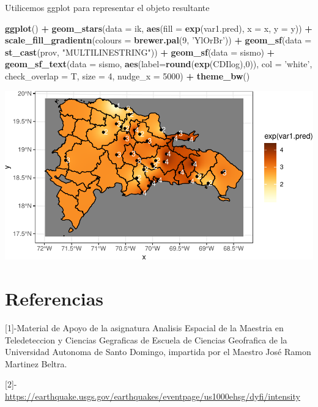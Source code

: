 \documentclass[11pt,]{article}
\newenvironment{Shaded}{\begin{snugshade}}{\end{snugshade}}
\newcommand{\KeywordTok}[1]{\textcolor[rgb]{0.13,0.29,0.53}{\textbf{#1}}}
\newcommand{\DataTypeTok}[1]{\textcolor[rgb]{0.13,0.29,0.53}{#1}}
\newcommand{\DecValTok}[1]{\textcolor[rgb]{0.00,0.00,0.81}{#1}}
\newcommand{\StringTok}[1]{\textcolor[rgb]{0.31,0.60,0.02}{#1}}
\newcommand{\OperatorTok}[1]{\textcolor[rgb]{0.81,0.36,0.00}{\textbf{#1}}}
\newcommand{\NormalTok}[1]{#1}
\begin{document}
Utilicemos ggplot para representar el objeto resultante

\begin{Shaded}
\begin{Highlighting}[]
\KeywordTok{ggplot}\NormalTok{() }\OperatorTok{+}
\StringTok{  }\KeywordTok{geom_stars}\NormalTok{(}\DataTypeTok{data =}\NormalTok{ ik, }\KeywordTok{aes}\NormalTok{(}\DataTypeTok{fill =} \KeywordTok{exp}\NormalTok{(var1.pred), }\DataTypeTok{x =}\NormalTok{ x, }\DataTypeTok{y =}\NormalTok{ y)) }\OperatorTok{+}\StringTok{ }
\StringTok{  }\KeywordTok{scale_fill_gradientn}\NormalTok{(}\DataTypeTok{colours =} \KeywordTok{brewer.pal}\NormalTok{(}\DecValTok{9}\NormalTok{, }\StringTok{'YlOrBr'}\NormalTok{)) }\OperatorTok{+}
\StringTok{  }\KeywordTok{geom_sf}\NormalTok{(}\DataTypeTok{data =} \KeywordTok{st_cast}\NormalTok{(prov, }\StringTok{"MULTILINESTRING"}\NormalTok{)) }\OperatorTok{+}
\StringTok{  }\KeywordTok{geom_sf}\NormalTok{(}\DataTypeTok{data =}\NormalTok{ sismo) }\OperatorTok{+}
\StringTok{  }\KeywordTok{geom_sf_text}\NormalTok{(}\DataTypeTok{data =}\NormalTok{ sismo, }\KeywordTok{aes}\NormalTok{(}\DataTypeTok{label=}\KeywordTok{round}\NormalTok{(}\KeywordTok{exp}\NormalTok{(CDIlog),}\DecValTok{0}\NormalTok{)), }\DataTypeTok{col =} \StringTok{'white'}\NormalTok{, }\DataTypeTok{check_overlap =}\NormalTok{ T, }\DataTypeTok{size =} \DecValTok{4}\NormalTok{, }\DataTypeTok{nudge_x =} \DecValTok{5000}\NormalTok{) }\OperatorTok{+}
\StringTok{  }\KeywordTok{theme_bw}\NormalTok{()}
\end{Highlighting}
\end{Shaded}

\includegraphics{proyecto_files/figure-latex/unnamed-chunk-29-1.pdf}

\section{Referencias}\label{referencias}

{[}1{]}-Material de Apoyo de la asignatura Analisis Espacial de la
Maestria en Teledeteccion y Ciencias Gegraficas de Escuela de Ciencias
Geofrafica de la Universidad Autonoma de Santo Domingo, impartida por el
Maestro José Ramon Martinez Beltra.

{[}2{]}-
\url{https://earthquake.usgs.gov/earthquakes/eventpage/us1000ehsg/dyfi/intensity}




\newpage
\singlespacing 
\end{document}
